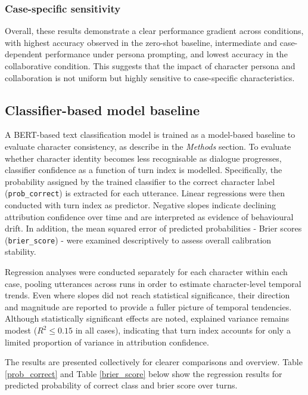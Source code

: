 \documentclass{article}
\begin{document}
\subsubsection{Case-specific sensitivity}

Overall, these results demonstrate a clear performance gradient across conditions, with highest accuracy observed in the zero-shot baseline, intermediate and case-dependent performance under persona prompting, and lowest accuracy in the collaborative condition. This suggests that the impact of character persona and collaboration is not uniform but highly sensitive to case-specific characteristics.

\subsection{Classifier-based model baseline}

A BERT-based text classification model is trained as a model-based baseline to evaluate character consistency, as describe in the \textit{Methods} section.  To evaluate whether character identity becomes less recognisable as dialogue progresses, classifier confidence as a function of turn index is modelled. Specifically, the probability assigned by the trained classifier to the correct character label (\texttt{prob\_correct}) is extracted for each utterance. Linear regressions were then conducted with turn index as predictor. Negative slopes indicate declining attribution confidence over time and are interpreted as evidence of behavioural drift. In addition,  the mean squared error of predicted probabilities - Brier scores (\texttt{brier\_score}) - were examined descriptively to assess overall calibration stability.

Regression analyses were conducted separately for each character within each case, pooling utterances across runs in order to estimate character-level temporal trends. Even where slopes did not reach statistical significance, their direction and magnitude are reported to provide a fuller picture of temporal tendencies. Although statistically significant effects are noted, explained variance remains modest ($R^2 \leq 0.15$ in all cases), indicating that turn index accounts for only a limited proportion of variance in attribution confidence.

The results are presented collectively for clearer comparisons and overview. Table \ref{prob_correct} and Table \ref{brier_score} below show the regression results for predicted probability of correct class and brier score over turns. 
\end{document}
